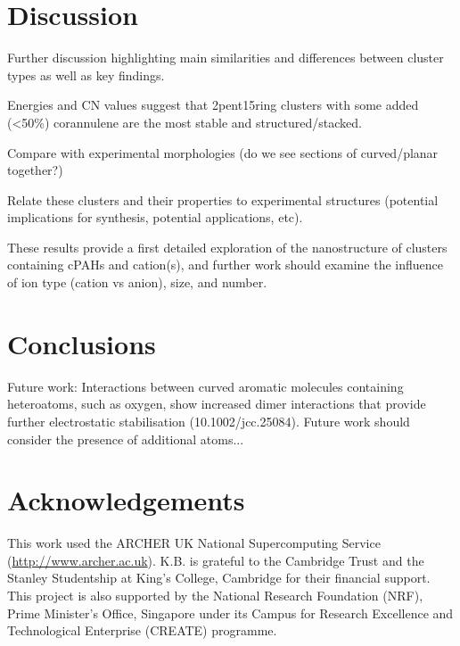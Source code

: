 \section{Discussion}
Further discussion highlighting main similarities and differences between cluster types as well as key findings.

Energies and CN values suggest that 2pent15ring clusters with some added (<50\%) corannulene are the most stable and structured/stacked.

Compare with experimental morphologies (do we see sections of curved/planar together?)

Relate these clusters and their properties to experimental structures (potential implications for synthesis, potential applications, etc).

These results provide a first detailed exploration of the nanostructure of clusters containing cPAHs and cation(s), and further work should examine the influence of ion type (cation vs anion), size, and number.



\section{Conclusions}

Future work:
Interactions between curved aromatic molecules containing heteroatoms, such as oxygen, show increased dimer interactions that provide further electrostatic stabilisation (10.1002/jcc.25084).  Future work should consider the presence of additional atoms...




\section*{Acknowledgements}
This work used the ARCHER UK National Supercomputing Service (\url{http://www.archer.ac.uk}).
K.B. is grateful to the Cambridge Trust and the Stanley Studentship at King's College, Cambridge for their financial support.
This project is also supported by the National Research Foundation (NRF), Prime Minister's Office, Singapore under its Campus for Research Excellence and Technological Enterprise (CREATE) programme.
